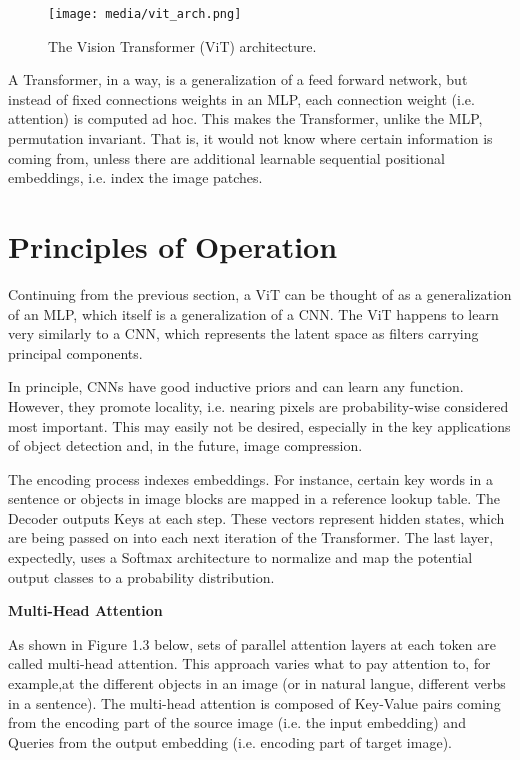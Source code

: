 \begin{figure}[H]
	\begin{center}
	\texttt{[image: media/vit\_arch.png]}
	\end{center}
	\caption[ViT Architecture]{The Vision Transformer (ViT) architecture. \citep{GoogleViT}}
	\end{figure}

A Transformer, in a way, is a generalization of a feed forward network, but 
instead of fixed connections weights in an MLP, each connection weight (i.e. attention) 
is computed ad hoc. This makes the Transformer, unlike the MLP, permutation invariant. 
That is, it would not know where certain information is coming from, unless there are additional 
learnable sequential positional embeddings, i.e. index the image patches.

\section{Principles of Operation}

Continuing from the previous section, a ViT can be thought of as a 
generalization of an MLP, which itself is a generalization of a CNN. 
The ViT happens to learn very similarly to a CNN, which represents the latent space
as filters carrying principal components.

In principle, CNNs have good inductive priors and can learn any function. 
However, they promote locality, i.e. nearing pixels are probability-wise considered most important.
This may easily not be desired, especially in the key applications of object detection and, in the 
future, image compression.


The encoding process indexes embeddings. For instance, certain key words in a sentence or 
objects in image blocks are mapped in a reference lookup table. 
The Decoder outputs Keys at each step. These vectors represent hidden states,
which are being passed on into each next iteration of the Transformer. 
The last layer, expectedly, uses a Softmax architecture to normalize and map the potential output classes 
to a probability distribution. 

\newpage

\textbf{Multi-Head Attention}


As shown in Figure 1.3 below, sets of parallel attention layers at each token are called multi-head attention.
This approach varies what to pay attention to, for example,at the different objects 
in an image (or in natural langue, different verbs in a sentence). 
The multi-head attention is composed of Key-Value pairs coming from 
the encoding part of the source image (i.e. the input embedding) and 
Queries from the output embedding (i.e. encoding part of target image).


